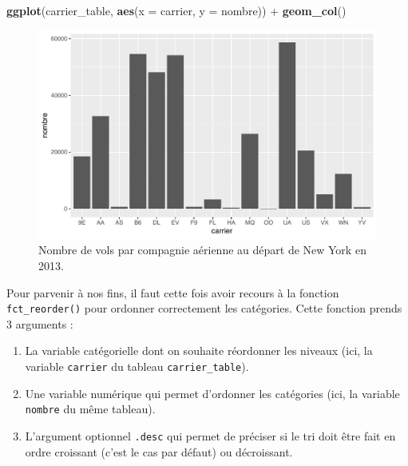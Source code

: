 \documentclass[a4paperpaper,]{article}
\newenvironment{Shaded}{\begin{snugshade}}{\end{snugshade}}
\newcommand{\DataTypeTok}[1]{\textcolor[rgb]{0.00,0.34,0.68}{#1}}
\newcommand{\KeywordTok}[1]{\textcolor[rgb]{0.12,0.11,0.11}{\textbf{#1}}}
\newcommand{\NormalTok}[1]{\textcolor[rgb]{0.12,0.11,0.11}{#1}}
\newcommand{\OperatorTok}[1]{\textcolor[rgb]{0.12,0.11,0.11}{#1}}
\newcommand{\StringTok}[1]{\textcolor[rgb]{0.75,0.01,0.01}{#1}}
\providecommand{\tightlist}{%
  \setlength{\itemsep}{0pt}\setlength{\parskip}{0pt}}
\begin{document}
\begin{Shaded}
\begin{Highlighting}[]
\KeywordTok{ggplot}\NormalTok{(carrier_table, }\KeywordTok{aes}\NormalTok{(}\DataTypeTok{x =}\NormalTok{ carrier, }\DataTypeTok{y =}\NormalTok{ nombre)) }\OperatorTok{+}
\StringTok{  }\KeywordTok{geom_col}\NormalTok{()}
\end{Highlighting}
\end{Shaded}

\begin{figure}[htpb]

{\centering \includegraphics[width=0.9\linewidth]{figure/bpcarriercol-1} 

}

\caption{Nombre de vols par compagnie aérienne au départ de New York en 2013.}\label{fig:bpcarriercol}
\end{figure}

Pour parvenir à nos fins, il faut cette fois avoir recours à la fonction \texttt{fct\_reorder()} pour ordonner correctement les catégories. Cette fonction prends 3 arguments :

\begin{enumerate}
\def\labelenumi{\arabic{enumi}.}
\tightlist
\item
  La variable catégorielle dont on souhaite réordonner les niveaux (ici, la variable \texttt{carrier} du tableau \texttt{carrier\_table}).
\item
  Une variable numérique qui permet d'ordonner les catégories (ici, la variable \texttt{nombre} du même tableau).
\item
  L'argument optionnel \texttt{.desc} qui permet de préciser si le tri doit être fait en ordre croissant (c'est le cas par défaut) ou décroissant.
\end{enumerate}
\end{document}
